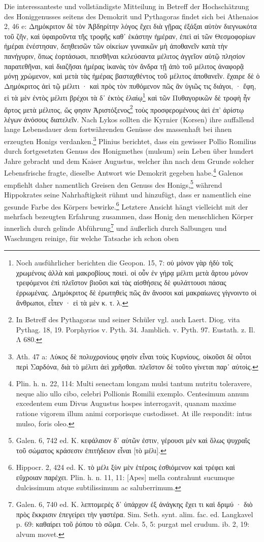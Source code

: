 \documentclass[a4paper, 11pt, oneside]{article}
\begin{document}
Die interessanteste und vollständigste Mitteilung in Betreff der Hochschätzung des Honiggenusses seitens des Demokrit und Pythagoras findet sich bei Athenaios 2, 46 e: Δημόκριτον δὲ τὸν Ἀβδηρίτην λόγος ἔχει διὰ γῇρας ἐξάξαι αὑτὸν διεγνωκότα τοῦ ζῆν, καὶ ὑφαιροῦντα τῆς τροφῆς καθ᾽ ἑκάστην ἡμέραν, ἐπεὶ αἱ τῶν Θεσμοφορίων ἡμέραι ἐνέστησαν, δεηθεισῶν τῶν οἰκείων γυναικῶν μὴ ἀποθανεῖν κατὰ τὴν πανήγυριν, ὅπως ἑορτάσωσι, πεισθῆναι κελεύσαντα μέλιτος ἀγγεῖον αὑτῷ πλησίον παρατεθῆναι, καὶ διαζῆσαι ἡμέρας ἱκανὰς τὸν ἄνδρα τῇ ἀπὸ τοῦ μέλιτος ἀναφορᾷ μόνῃ χρώμενον, καὶ μετὰ τὰς ἡμέρας βασταχθέντος τοῦ μέλιτος ἀποθανεῖν. ἔχαιρε δὲ ὁ Δημόκριτος ἀεὶ τῷ μέλιτι · καὶ πρὸς τὸν πυθόμενον πῶς ἂν ὑγιῶς τις διάγοι, · ἔφη, εἰ τὰ μὲν ἐντὸς μέλιτι βρέχοι τὰ δ᾽ ἐκτὸς ἐλαίῳ\footnote{Noch ausführlicher berichten die Geopon. 15, 7: οὐ μόνον γὰρ ἡδὺ τοῖς χρωμένοις ἀλλὰ καὶ μακροβίους ποιεὶ. οἱ οὖν ἐν γήρᾳ μέλιτι μετὰ ἄρτου μόνον τρεφόμενοι ἐπὶ πλεῖστον βιοῦσι καὶ τὰς αἰσθήσεις δὲ φυλάττουσι πάσας ἐρρωμένας. Δημόκριτος δὲ ἐρωτηθεὶς πῶς ἂν ἄνοσοι καὶ μακραίωνες γίγνοιντο οἱ ἄνθρωποι, εἷπεν · εἰ τὰ μὲν κ. τ. λ.} καὶ τῶν Πυθαγορικῶν δὲ τροφὴ ἦν ἄρτος μετὰ μέλιτος, ὥς φησιν Ἀριστόξενος\footnote{In Betreff des Pythagoras und seiner Schüler vgl. auch Laert. Diog. vita Pythag. 18, 19. Porphyrios v. Pyth. 34. Jamblich. v. Pyth. 97. Eustath. z. Il. Λ 680.} τοὺς προσφερομένους ἀεὶ ἐπ' ἀρίστῳ λέγων ἀνόσους διατελεῖν. Nach Lykos sollten die Kyrnier (Korsen) ihre auffallend lange Lebensdauer dem fortwährenden Genüsse des massenhaft bei ihnen erzeugten Honigs verdanken.\footnote{Ath. 47 a: Λύκος δὲ πολυχρονίους φησὶν εἶναι τοὺς Κυρνίους, οἰκοῦσι δὲ οὗτοι περὶ Σαρδόνα, διὰ τὸ μέλιτι ἀεὶ χρῆσθαι. πλεῖστον δὲ τοῦτο γίνεται παρ᾽ αὐτοὶς.} Plinius berichtet, dass ein gewisser Pollio Romilius durch fortgesetzten Genuss des Honigmethes (mulsum) sein Leben über hundert Jahre gebracht und dem Kaiser Augustus, welcher ihn nach dem Grunde solcher Lebensfrische fragte, dieselbe Antwort wie Demokrit gegeben habe.\footnote{Plin. h. n. 22, 114: Multi senectam longam mulsi tantum nutritu toleravere, neque alio ullo cibo, celebri Pollionis Romilii exemplo. Centesimum annum excedentem eum Divus Augustus hospes interrogavit, quanam maxime ratione vigorem illum animi corporisque custodisset. At ille respondit: intus mulso, foris oleo.} Galenos empfiehlt daher namentlich Greisen den Genuss des Honigs,\footnote{Galen. 6, 742 ed. K. κεφάλαιον δ᾽ αὐτῶν ἐστιν, γέρουσι μὲν καὶ ὅλως ψυχραῖς τοῦ σώματος κράσεσιν ἐπιτήδειον εἶναι [τὸ μέλι].} während Hippokrates seine Nahrhaftigkeit rühmt und hinzufügt, dass er namentlich eine gesunde Farbe des Körpers bewirke.\footnote{Hippocr. 2, 424 ed. K. τὸ μέλι ξὺν μὲν ἑτέροις ἐσθιόμενον καὶ τρέφει καὶ εὔχροιαν παρέχει. Plin. h. n. 11, 11: [Apes] mella contrahunt sucumque dulcissimum atque subtilissimum ac saluberrimum.} Letztere Ansicht hängt vielleicht mit der mehrfach bezeugten Erfahrung zusammen, dass Honig den menschlichen Körper innerlich durch gelinde Abführung\footnote{Galen. 6, 740 ed. K. λεπτομερὲς δ᾽ ὑπάρχον ἐξ ἀνάγκης ἔχει τι καὶ δριμύ · διὸ πρὸς ἔκκρισιν ἐπεγείρει τὴν γαστέρα. Sim. Seth. synt. alim. fac. ed. Langkavel p. 69: καθαίρει τοῦ ῥύπου τὸ σῶμα. Cels. 5, 5: purgat mel crudum. ib. 2, 19: alvum movet.} und äußerlich durch Salbungen und Waschungen reinige, für welche Tatsache ich schon oben 
\end{document}
